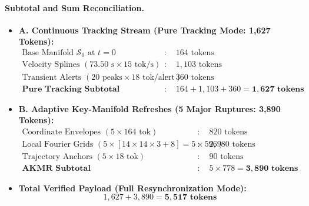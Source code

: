 \documentclass[11pt]{article}
\begin{document}
\paragraph{Subtotal and Sum Reconciliation.}
\begin{itemize}
    \item \textbf{A. Continuous Tracking Stream (Pure Tracking Mode: 1,627 Tokens):}
    \begin{align}
    \text{Base Manifold } \mathcal{S}_0 \text{ at } t=0 &: \quad 164\text{ tokens} \nonumber \\
    \text{Velocity Splines } (73.50\text{ s} \times 15\text{ tok/s}) &: \quad 1,103\text{ tokens} \nonumber \\
    \text{Transient Alerts } (20\text{ peaks} \times 18\text{ tok/alert}) &: \quad 360\text{ tokens} \nonumber \\
    \textbf{Pure Tracking Subtotal} &: \quad 164 + 1,103 + 360 = \mathbf{1,627\text{ tokens}}
    \end{align}
    \item \textbf{B. Adaptive Key-Manifold Refreshes (5 Major Ruptures: 3,890 Tokens):}
    \begin{align}
    \text{Coordinate Envelopes } (5 \times 164\text{ tok}) &: \quad 820\text{ tokens} \nonumber \\
    \text{Local Fourier Grids } (5 \times [14\times14\times3 + 8] = 5 \times 596) &: \quad 2,980\text{ tokens} \nonumber \\
    \text{Trajectory Anchors } (5 \times 18\text{ tok}) &: \quad 90\text{ tokens} \nonumber \\
    \textbf{AKMR Subtotal} &: \quad 5 \times 778 = \mathbf{3,890\text{ tokens}}
    \end{align}
    \item \textbf{Total Verified Payload (Full Resynchronization Mode):}
    \begin{equation}
    1,627 + 3,890 = \mathbf{5,517\text{ tokens}}
    \end{equation}
\end{itemize}
\end{document}
